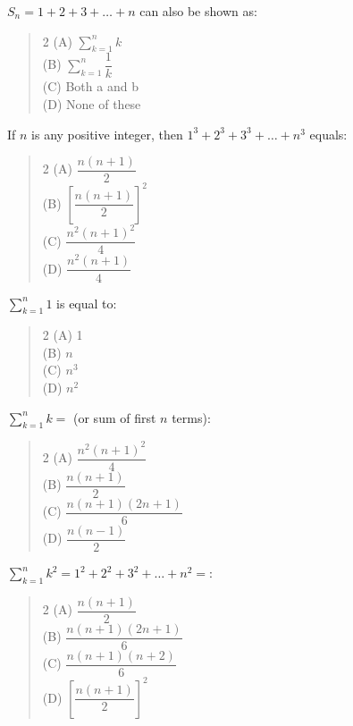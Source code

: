 \documentclass[11pt,a4paper]{article}
\begin{document}
\begin{mcqlist}
\item $S_n=1+2+3+\ldots+n$ can also be shown as:
\begin{quote}\begin{multicols}{2}
\noindent (A) $\displaystyle\sum_{k=1}^n k$ \\
(B) $\displaystyle\sum_{k=1}^n \dfrac{1}{k}$ \\
(C) Both a and b \\
(D) None of these
\end{multicols}\end{quote}

\item If $n$ is any positive integer, then $1^3+2^3+3^3+\ldots+n^3$ equals:
\begin{quote}\begin{multicols}{2}
\noindent (A) $\dfrac{n(n+1)}{2}$ \\
(B) $\left[\dfrac{n(n+1)}{2}\right]^2$ \\
(C) $\dfrac{n^2(n+1)^2}{4}$ \\
(D) $\dfrac{n^2(n+1)}{4}$
\end{multicols}\end{quote}

\item $\displaystyle\sum_{k=1}^n 1$ is equal to:
\begin{quote}\begin{multicols}{2}
\noindent (A) 1 \\
(B) $n$ \\
(C) $n^3$ \\
(D) $n^2$
\end{multicols}\end{quote}

\item $\displaystyle\sum_{k=1}^n k=$ (or sum of first $n$ terms):
\begin{quote}\begin{multicols}{2}
\noindent (A) $\dfrac{n^2(n+1)^2}{4}$ \\
(B) $\dfrac{n(n+1)}{2}$ \\
(C) $\dfrac{n(n+1)(2n+1)}{6}$ \\
(D) $\dfrac{n(n-1)}{2}$
\end{multicols}\end{quote}

\item $\displaystyle\sum_{k=1}^n k^2=1^2+2^2+3^2+\ldots+n^2=$:
\begin{quote}\begin{multicols}{2}
\noindent (A) $\dfrac{n(n+1)}{2}$ \\
(B) $\dfrac{n(n+1)(2n+1)}{6}$ \\
(C) $\dfrac{n(n+1)(n+2)}{6}$ \\
(D) $\left[\dfrac{n(n+1)}{2}\right]^2$
\end{multicols}\end{quote}


\end{mcqlist}
\end{document}
